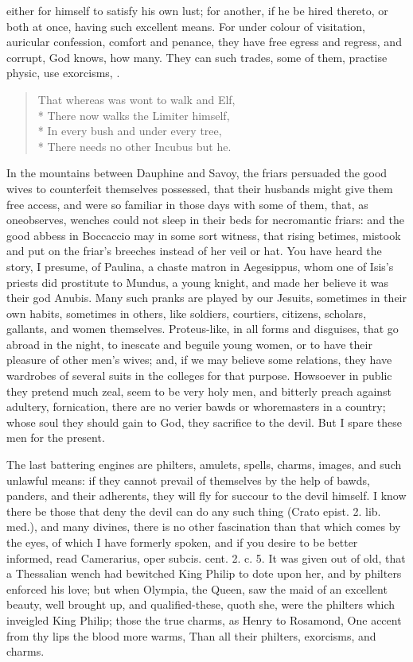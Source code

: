 {either for himself to satisfy his own lust; for another, if he be hired
thereto, or both at once, having such excellent means. For under colour
of visitation, auricular confession, comfort and penance, they have
free egress and regress, and corrupt, God knows, how many. They can
such trades, some of them, practise physic, use exorcisms, \etc{}.
%
{\gothfont
\begin{verse}
That whereas was wont to walk and Elf,\\*
There now walks the Limiter himself,\\*
In every bush and under every tree,\\*
There needs no other Incubus but he.
\end{verse}}
%
In the mountains between Dauphine and Savoy, the friars persuaded
the good wives to counterfeit themselves possessed, that their husbands
might give them free access, and were so familiar in those days with
some of them, that, as oneobserves, wenches could not sleep in
their beds for necromantic friars: and the good abbess in Boccaccio may
in some sort witness, that rising betimes, mistook and put on the
friar's breeches instead of her veil or hat. You have heard the story,
I presume, of  Paulina, a chaste matron in Aegesippus, whom one
of Isis's priests did prostitute to Mundus, a young knight, and made
her believe it was their god Anubis. Many such pranks are played by our
Jesuits, sometimes in their own habits, sometimes in others, like
soldiers, courtiers, citizens, scholars, gallants, and women
themselves. Proteus-like, in all forms and disguises, that go abroad in
the night, to inescate and beguile young women, or to have their
pleasure of other men's wives; and, if we may believe  some
relations, they have wardrobes of several suits in the colleges for
that purpose. Howsoever in public they pretend much zeal, seem to be
very holy men, and bitterly preach against adultery, fornication, there
are no verier bawds or whoremasters in a country; whose soul they
should gain to God, they sacrifice to the devil. But I spare these men
for the present.

The last battering engines are philters, amulets, spells, charms,
images, and such unlawful means: if they cannot prevail of themselves
by the help of bawds, panders, and their adherents, they will fly for
succour to the devil himself. I know there be those that deny the devil
can do any such thing (Crato epist. 2. lib. med.), and many divines,
there is no other fascination than that which comes by the eyes, of
which I have formerly spoken, and if you desire to be better informed,
read Camerarius, oper subcis. cent. 2. c. 5. It was given out of old,
that a Thessalian wench had bewitched King Philip to dote upon her, and
by philters enforced his love; but when Olympia, the Queen, saw the
maid of an excellent beauty, well brought up, and qualified-these,
quoth she, were the philters which inveigled King Philip; those the
true charms, as Henry to Rosamond,
One accent from thy lips the blood more warms,
Than all their philters, exorcisms, and charms.

}
